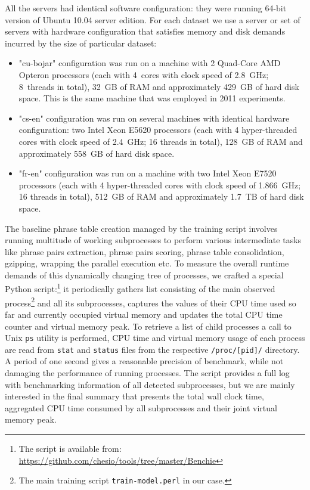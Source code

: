 All the servers had identical software configuration:
they were running 64-bit version of Ubuntu 10.04 server edition.
For each dataset we use a server or set of servers with hardware configuration
that satisfies memory and disk demands incurred by the size of particular dataset:
\begin{itemize}
  \item "cu-bojar" configuration was run on a machine with 2 Quad-Core
  AMD Opteron\texttrademark{} processors
  (each with 4~cores with clock speed of 2.8~GHz; 8~threads in total),
  32~GB of RAM and approximately 429~GB of hard disk space. %
  This is the same machine that was employed in 2011 experiments.
  \item "cs-en" configuration was run on several machines with identical hardware
  configuration: two Intel\textregistered{} Xeon\textregistered{} E5620
  processors
  (each with 4 hyper-threaded cores with clock speed of 2.4~GHz; 16 threads in total),
  128~GB of RAM and approximately 558~GB of hard disk space. %
  \item "fr-en" configuration was run on a machine with two Intel\textregistered{}
  Xeon\textregistered{} E7520
  processors
  (each with 4 hyper-threaded cores with clock speed of 1.866~GHz; 16 threads in total),
  512~GB of RAM and approximately 1.7~TB of hard disk space. %
\end{itemize}

The baseline phrase table creation managed by the training script involves
running multitude of working subprocesses to perform various intermediate
tasks like phrase pairs extraction, phrase pairs scoring, phrase table
consolidation, gzipping, wrapping the parallel execution etc.
To measure the overall runtime demands of this dynamically changing tree
of processes, we crafted a special Python script:\footnote{The script is available
from: \url{https://github.com/chesio/tools/tree/master/Benchie}}
it periodically gathers list consisting of the main observed
process\footnote{The main training script \texttt{train-model.perl} in our case.}
and all its subprocesses, captures the values of their CPU time used so far
and currently occupied virtual memory and updates the total CPU time counter
and virtual memory peak.
To retrieve a list of child processes a call to Unix \verb|ps| utility is
performed, CPU time and virtual memory usage of each process are read from
\verb|stat| and \verb|status| files from the respective \verb|/proc/[pid]/|
directory.
A period of one second gives a reasonable precision of benchmark, while
not damaging the performance of running processes.
The script provides a full log with benchmarking information of all detected
subprocesses, but we are mainly interested in the final summary that presents
the total wall clock time, aggregated CPU time consumed by all subprocesses
and their joint virtual memory peak.

